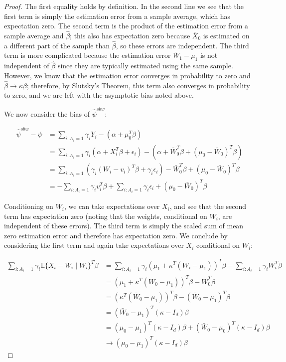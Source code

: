 \documentclass{article}
\begin{document}
\begin{appendix}
\begin{proof}
The first equality holds by definition. In the second line we see that the first term is simply the estimation error from a sample average, which has expectation zero. The second term is the product of the estimation error from a sample average and $\hat{\beta}$; this also has expectation zero because $\bar{X}_0$ is estimated on a different part of the sample than $\hat{\beta}$, so these errors are independent. The third term is more complicated because the estimation error $\bar{W}_1 - \mu_1$ is not independent of $\hat{\beta}$ since they are typically estimated using the same sample. However, we know that the estimation error converges in probability to zero and $\hat{\beta} \to \kappa\beta$; therefore, by Slutsky's Theorem, this term also converges in probability to zero, and we are left with the asymptotic bias noted above. 

We now consider the bias of $\hat{\psi}^{sbw}$:

\begin{align*}
    \hat{\psi}^{sbw} - \psi &= \sum_{i: A_i = 1}\gamma_iY_i - (\alpha + \mu_0^T\beta) \\
    &= \sum_{i: A_i = 1} \gamma_i(\alpha + X_i^T\beta + \epsilon_i) - (\alpha + \bar{W}_0^T\beta + (\mu_0 - \bar{W}_0)^T\beta) \\
    &= \sum_{i: A_i = 1} (\gamma_i(W_i - v_i)^T\beta + \gamma_i\epsilon_i) - \bar{W}_0^T\beta + (\mu_0 - \bar{W}_0)^T\beta \\
    &= -\sum_{i: A_i = 1}\gamma_iv_i^T\beta + \sum_{i: A_i = 1}\gamma_i\epsilon_i  + (\mu_0 - \bar{W}_0)^T\beta
\end{align*}

Conditioning on $W_i$, we can take expectations over $X_i$, and see that the second term has expectation zero (noting that the weights, conditional on $W_i$, are independent of these errors). The third term is simply the scaled sum of mean zero estimation error and therefore has expectation zero. We conclude by considering the first term and again take expectations over $X_i$ conditional on $W_i$: 

\begin{align*}
    \sum_{i: A_i = 1} \gamma_i\mathbb{E}\{X_i - W_i \mid W_i\}^T\beta &= \sum_{i: A_i = 1} \gamma_i (\mu_1 + \kappa^T(W_i - \mu_1))^T\beta - \sum_{i: A_i = 1}\gamma_i W_i^T\beta \\
    &= (\mu_1 + \kappa^T(\bar{W}_0 - \mu_1))^T\beta - \bar{W}_0^T\beta \\
    &= (\kappa^T(\bar{W}_0 - \mu_1))^T\beta - (\bar{W}_0 - \mu_1)^T\beta  \\
    &= (\bar{W}_0 - \mu_1)^T(\kappa - I_d)\beta \\
    &= (\mu_0 - \mu_1)^T(\kappa - I_d)\beta + (\bar{W}_0 - \mu_0)^T(\kappa - I_d)\beta \\
    &\to (\mu_0 - \mu_1)^T(\kappa - I_d)\beta
\end{align*}


\end{proof}
\end{appendix}
\end{document}
